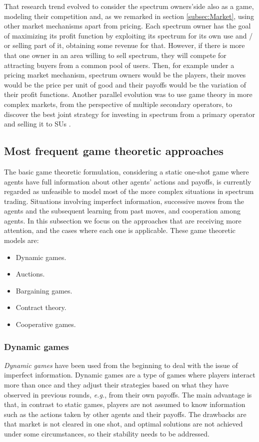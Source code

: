 That research trend evolved to consider the spectrum owners'side also as a game, modeling their competition \cite{ref:Xing2007,ref:Maille2009,ref:Shen2013} and, as we remarked in section \ref{subsec:Market}, using other market mechanisms apart from pricing. 
Each spectrum owner has the goal of maximizing its profit function by exploiting its spectrum for its own use and / or selling part of it, obtaining some revenue for that. 
However, if there is more that one owner in an area willing to sell spectrum, they will compete for attracting buyers from a common pool of users. 
Then, for example under a pricing market mechanism, spectrum owners would be the players, their moves would be the price per unit of good and their payoffs would be the variation of their profit functions. 
Another parallel evolution was to use game theory in more complex markets, from the perspective of multiple secondary operators, to discover the best joint strategy for investing in spectrum from a primary operator and selling it to SUs \cite{ref:Jia2008,ref:Kim2011,ref:Zhu2012_Dyn}. 

\subsection{Most frequent game theoretic approaches}
The basic game theoretic formulation, considering a static one-shot game where agents have full information about other agents' actions and payoffs, is currently regarded as unfeasible to model most of the more complex situations in spectrum trading. Situations involving imperfect information, successive moves from the agents and the subsequent learning from past moves, and cooperation among agents.
In this subsection we focus on the approaches that are receiving more attention, and the cases where each one is applicable. These game theoretic models are:
\begin{itemize}
	\item Dynamic games.
	\item Auctions.
	\item Bargaining games.
	\item Contract theory.
	\item Cooperative games.
\end{itemize}

\subsubsection{Dynamic games}
\textit{Dynamic games} have been used from the beginning to deal with the issue of imperfect information. 
Dynamic games are a type of games where players interact more than once and they adjust their strategies based on what they have observed in previous rounds, \textit{e.g.}, from their own payoffs. 
The main advantage is that, in contrast to static games, players are not assumed to know information such as the actions taken by other agents and their payoffs. 
The drawbacks are that market is not cleared in one shot, and optimal solutions are not achieved under some circumstances, so their stability needs to be addressed. 

